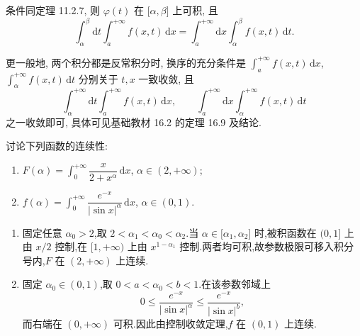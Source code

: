 \begin{theorem}
    条件同定理 11.2.7, 则 $\varphi(t)$ 在 $\lbrack\alpha,\beta\rbrack$ 上可积, 且
    \[
        \displaystyle\int_\alpha^\beta\mathrm{d}t\int_a^{+\infty}f(x,t)\,\mathrm{d}x
        =\int_a^{+\infty}\mathrm{d}x\int_\alpha^\beta f(x,t)\,\mathrm{d}t.
    \]
\end{theorem}

\begin{remark}
    更一般地, 两个积分都是反常积分时, 换序的充分条件是 $\displaystyle\int_a^{+\infty}f(x,t)\,\mathrm{d}x$,$\displaystyle\int_\alpha^{+\infty}f(x,t)\,\mathrm{d}t$ 分别关于 $t,x$ 一致收敛, 且
    \[
        \displaystyle\int_\alpha^{+\infty}\mathrm{d}t\int_a^{+\infty}f(x,t)\,\mathrm{d}x,
        \qquad
        \int_a^{+\infty}\mathrm{d}x\int_\alpha^{+\infty}f(x,t)\,\mathrm{d}t
    \]
    之一收敛即可, 具体可见基础教材 16.2 的定理 16.9 及结论.
\end{remark}

\begin{example}
    讨论下列函数的连续性:
    \begin{enumerate}
        \item $\displaystyle F(\alpha)=\int_0^{+\infty}\dfrac{x}{2+x^\alpha}\,\mathrm{d}x$, $\alpha\in(2,+\infty)$;
        \item $\displaystyle f(\alpha)=\int_0^{+\infty}\dfrac{e^{-x}}{|\sin x|^\alpha}\,\mathrm{d}x$, $\alpha\in(0,1)$.
    \end{enumerate}
\end{example}
\exampleblank

\begin{solution}
    \leavevmode
    \begin{enumerate}
        \item 固定任意 $\alpha_0>2$,取 $2<\alpha_1<\alpha_0<\alpha_2$.当
              $\alpha\in\lbrack\alpha_1,\alpha_2\rbrack$ 时,被积函数在 $(0,1\rbrack$ 上由 $x/2$ 控制,在 $\lbrack1,+\infty)$ 上由 $x^{1-\alpha_1}$ 控制.两者均可积,故参数极限可移入积分号内,$F$ 在 $(2,+\infty)$ 上连续.
        \item 固定 $\alpha_0\in(0,1)$,取 $0<a<\alpha_0<b<1$.在该参数邻域上
              \[
                  0\leq\dfrac{e^{-x}}{|\sin x|^\alpha}
                  \leq\dfrac{e^{-x}}{|\sin x|^b},
              \]
              而右端在 $(0,+\infty)$ 可积.因此由控制收敛定理,$f$ 在 $(0,1)$ 上连续.
    \end{enumerate}
\end{solution}

